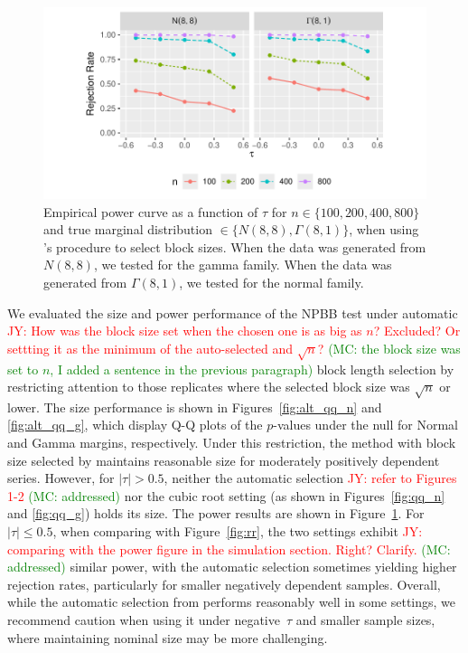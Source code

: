 \documentclass[12pt]{article}
\newcommand{\jy}[1]{\textcolor{red}{JY: #1}}
\newcommand{\mc}[1]{\textcolor{green}{(MC: #1)}}
\begin{document}
\begin{figure}[tbp]
  \centering
  \includegraphics[scale=1]{figures/alt_rr}
  \caption{Empirical power curve as a function of $\tau$ for
    $n \in \{100, 200, 400, 800\}$ and true marginal distribution
    $\in \{N(8,8), \Gamma(8,1)\}$, when using \citet{politis2004automatic}'s 
    procedure
    to select block sizes. When the data was generated from $N(8,8)$,
    we tested for the gamma family. When the data was generated from
    $\Gamma(8,1)$, we tested for the normal family.
  }
  \label{fig:alt_rr}
\end{figure}


We evaluated the size and power performance of the NPBB test under automatic
\jy{How was the block size set when the chosen one is as big as $n$?
  Excluded? Or settting it as the minimum of the auto-selected and $\sqrt{n}$?}
\mc{the block size was set to $n$, I added a sentence in the previous paragraph}
block length selection by restricting attention to those replicates where
the selected block size was $\sqrt{n}$ or lower. The size performance is shown
in Figures~\ref{fig:alt_qq_n} and \ref{fig:alt_qq_g}, which display Q-Q plots
of the $p$-values under the null for Normal and Gamma margins, respectively.
Under this restriction, the method with block size selected by
\citet{politis2004automatic} maintains reasonable size for moderately positively
dependent series. However, for $|\tau| > 0.5$, neither the automatic selection
\jy{refer to Figures 1-2}
\mc{addressed}
nor the cubic root setting (as shown in Figures~\ref{fig:qq_n} and 
\ref{fig:qq_g}) holds its size. The power results are shown in
Figure~\ref{fig:alt_rr}. For $|\tau| \leq 0.5$, when comparing 
with Figure~\ref{fig:rr}, the two settings exhibit
\jy{comparing with the power figure in the simulation section. Right? Clarify.}
\mc{addressed}
similar power, with the automatic selection sometimes yielding higher
rejection rates, particularly for smaller negatively dependent samples.
Overall, while the automatic selection from \citet{politis2004automatic}
performs reasonably well in some settings, we recommend caution when using
it under negative~$\tau$ and smaller sample sizes, where maintaining nominal
size may be more challenging.
\end{document}
